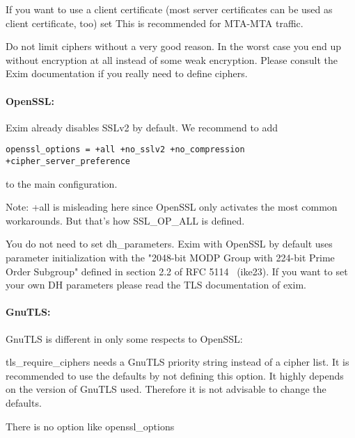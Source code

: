 If you want to use a client certificate (most server certificates can be used as client certificate, too) set
This is recommended for MTA-MTA traffic.

Do not limit ciphers without a very good reason. In the worst case you end up without encryption at all instead of some weak encryption. Please consult the Exim documentation if you really need to define ciphers.

\paragraph{OpenSSL:}
Exim already disables SSLv2 by default. We recommend to add
\begin{lstlisting}
openssl_options = +all +no_sslv2 +no_compression +cipher_server_preference
\end{lstlisting}
to the main configuration.

Note: +all is misleading here since OpenSSL only activates the most common workarounds. But that's how SSL\_OP\_ALL is defined.

You do not need to set dh\_parameters. Exim with OpenSSL by default uses parameter initialization with the "2048-bit MODP Group with 224-bit Prime Order Subgroup" defined in section 2.2 of RFC 5114~\cite{rfc5114} (ike23).
If you want to set your own DH parameters please read the TLS documentation of exim.


\paragraph{GnuTLS:}
GnuTLS is different in only some respects to OpenSSL:
\begin{itemize*}
  \item tls\_require\_ciphers needs a GnuTLS priority string instead of a cipher list. It is recommended to use the defaults by not defining this option. It highly depends on the version of GnuTLS used. Therefore it is not advisable to change the defaults.
  \item There is no option like openssl\_options
\end{itemize*}

